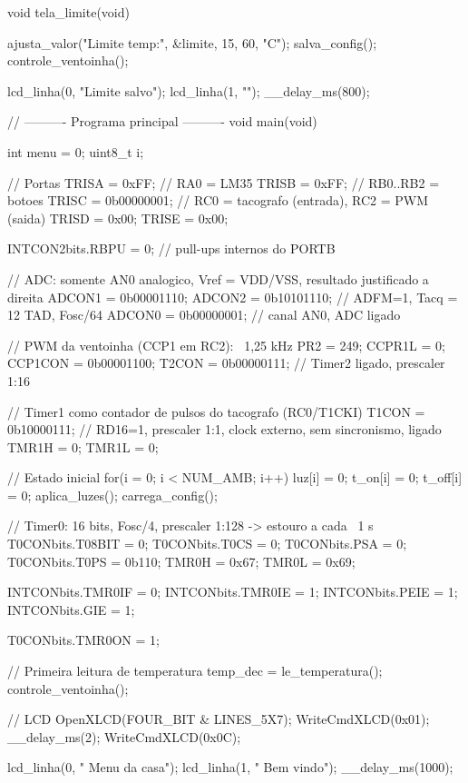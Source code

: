 void tela_limite(void)
{
    ajusta_valor("Limite temp:", &limite, 15, 60, "C");
    salva_config();
    controle_ventoinha();

    lcd_linha(0, "Limite salvo");
    lcd_linha(1, "");
    __delay_ms(800);
}

// ---------- Programa principal ----------
void main(void)
{
    int menu = 0;
    uint8_t i;

    // Portas
    TRISA = 0xFF;               // RA0 = LM35
    TRISB = 0xFF;               // RB0..RB2 = botoes
    TRISC = 0b00000001;         // RC0 = tacografo (entrada), RC2 = PWM (saida)
    TRISD = 0x00;
    TRISE = 0x00;

    INTCON2bits.RBPU = 0;       // pull-ups internos do PORTB

    // ADC: somente AN0 analogico, Vref = VDD/VSS, resultado justificado a direita
    ADCON1 = 0b00001110;
    ADCON2 = 0b10101110;        // ADFM=1, Tacq = 12 TAD, Fosc/64
    ADCON0 = 0b00000001;        // canal AN0, ADC ligado

    // PWM da ventoinha (CCP1 em RC2): ~1,25 kHz
    PR2 = 249;
    CCPR1L = 0;
    CCP1CON = 0b00001100;
    T2CON = 0b00000111;         // Timer2 ligado, prescaler 1:16

    // Timer1 como contador de pulsos do tacografo (RC0/T1CKI)
    T1CON = 0b10000111;         // RD16=1, prescaler 1:1, clock externo, sem sincronismo, ligado
    TMR1H = 0;
    TMR1L = 0;

    // Estado inicial
    for(i = 0; i < NUM_AMB; i++)
    {
        luz[i] = 0;
        t_on[i] = 0;
        t_off[i] = 0;
    }
    aplica_luzes();
    carrega_config();

    // Timer0: 16 bits, Fosc/4, prescaler 1:128 -> estouro a cada ~1 s
    T0CONbits.T08BIT = 0;
    T0CONbits.T0CS = 0;
    T0CONbits.PSA = 0;
    T0CONbits.T0PS = 0b110;
    TMR0H = 0x67;
    TMR0L = 0x69;

    INTCONbits.TMR0IF = 0;
    INTCONbits.TMR0IE = 1;
    INTCONbits.PEIE = 1;
    INTCONbits.GIE = 1;

    T0CONbits.TMR0ON = 1;

    // Primeira leitura de temperatura
    temp_dec = le_temperatura();
    controle_ventoinha();

    // LCD
    OpenXLCD(FOUR_BIT & LINES_5X7);
    WriteCmdXLCD(0x01);
    __delay_ms(2);
    WriteCmdXLCD(0x0C);

    lcd_linha(0, " Menu da casa");
    lcd_linha(1, "   Bem vindo");
    __delay_ms(1000);

}
